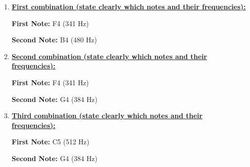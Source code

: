 \documentclass[12pt,oneside]{article}
\begin{document}
\parttwo

\begin{enumerate}

\item \underline{\bf First combination (state clearly which notes and their frequencies):}
\color{red}

\textbf{First Note:} F4 (341 Hz)

\par

\textbf{Second Note:} B4 (480 Hz)

\color{black}
\item \underline{\bf Second combination (state clearly which notes and their frequencies):}
\color{red}

\textbf{First Note:} F4 (341 Hz)

\par

\textbf{Second Note:} G4 (384 Hz)

\color{black}
\item \underline{\bf Third combination (state clearly which notes and their frequencies):}
\color{red}

\textbf{First Note:} C5 (512 Hz)

\par

\textbf{Second Note:} G4 (384 Hz)

\color{black}
\end{enumerate}

\partthree
\end{document}
